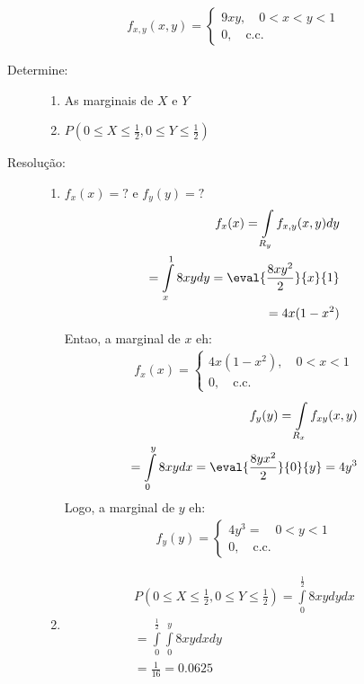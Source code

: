 \begin{description}
\begin{description}
    \begin{align*}
      f_{x,y} (x,y) = \begin{cases}
       9xy, \quad 0<x<y<1  \\
       0, \quad \text{c.c.}
      \end{cases}
    \end{align*}
\item [Determine:]
    \begin{enumerate}[label=(\alph*)]
      \item As marginais de $X$ e $Y$
      \item $P(0 \leq X \leq \frac{1}{2}, 0 \leq Y \leq \frac{1}{2})$
    \end{enumerate}
\item [Resolução:]
   \begin{enumerate}[label=(\alph*)]
     \item $f_{x} (x)= ?$ e $f_{y}(y)=?$
      \begin{align*}
        f_{x} (x)= \int \limits_{R_{y}} f_{x,y} (x,y) dy \\
        = \int \limits_{x}^{1} 8xy dy = \eval{ \frac{8xy^2}{2} }{x}{1} \\
      = 4x(1-x^2)
      \end{align*}
      Entao, a marginal de $x$ eh:
      \begin{align*}
        f_{x} (x)= \begin{cases}
          4x(1-x^2) , \quad 0<x<1 \\
          0, \quad \text{c.c.}
        \end{cases}
      \end{align*}
        \begin{align*}
          f_{y}(y)= \int \limits_{R_{x}} f_{xy} (x,y) \\
          = \int \limits_{0}^{y} 8xy dx = \eval{\frac{8yx^2}{2}}{0}{y} = 4y^3
        \end{align*}
        Logo, a marginal de $y$ eh:
        \begin{align*}
          f_{y }(y)= \begin{cases}
           4y^3= \quad 0<y<1 \\
           0, \quad \text{c.c.}
          \end{cases}
        \end{align*}
      \item 
        \begin{align*}
          P(0 \leq X \leq \frac{1}{2}, 0 \leq Y \leq \frac{1}{2}) = \int \limits_{0}^{\frac{1}{2}} 8xy dy dx\\
          = \int \limits_{0}^{\frac{1}{2}} \int \limits_{0}^{y} 8xy dx dy \\
          = \frac{1}{16}=0.0625
        \end{align*}
   \end{enumerate} 
    \end{description}

\end{description}
